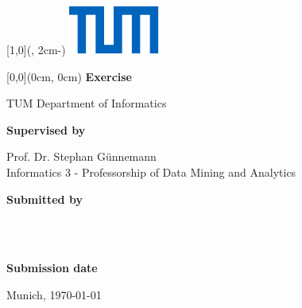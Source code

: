 \begin{textblock*}{\UniversitaetLogoBreite}[1,0](\textwidth-1mm, 2cm-\SeitenrandOben)%
	\raggedleft\includegraphics{../Ressources/Universitaet_Logo_RGB.pdf}%
\end{textblock*}


\begin{textblock*}{\textwidth}[0,0](0cm, 0cm)%
	{\fontsize{24pt}{26pt}\selectfont\textbf{Exercise}}
	
	\vspace*{14pt}
	{\fontsize{18pt}{27pt}\selectfont\textbf{\ExerciseNumber}}
\end{textblock*}

\vspace*{92.2mm}
\fontsize{15pt}{17.5pt}\selectfont%
TUM Department of Informatics

\renewcommand{\baselinestretch}{1.47}
\normalsize\selectfont
\vspace*{17.1mm}
\textbf{Supervised by}\tab
\begin{minipage}[t]{\textwidth-\CurrentLineWidth}
	Prof. Dr. Stephan Günnemann\\
	Informatics 3 - Professorship of Data Mining and Analytics\strut
\end{minipage}

\vspace*{4.3mm}
\textbf{Submitted by}\tab
\begin{minipage}[t]{\textwidth-\CurrentLineWidth}
	\PersonOne\\
	\PersonTwo\\
	\PersonThree
\end{minipage}

\vspace*{-1mm}
\textbf{Submission date}\tab 
\begin{minipage}[t]{\textwidth-\CurrentLineWidth}
	Munich, \today
\end{minipage}
\newpage